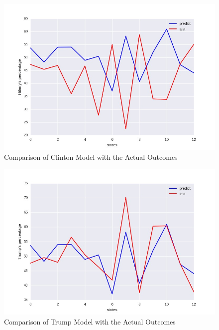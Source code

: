 \documentclass{article}
\begin{document}
{\begin{figure}[!htb]
  \centering
    \includegraphics[scale=0.5]{HillaryVerification}
  \caption{Comparison of Clinton Model with the Actual Outcomes}
\end{figure}

\begin{figure}[!htb]
  \centering
    \includegraphics[scale=0.5]{TrumpVerification}
  \caption{Comparison of Trump Model with the Actual Outcomes}
\end{figure}  

}
\end{document}
